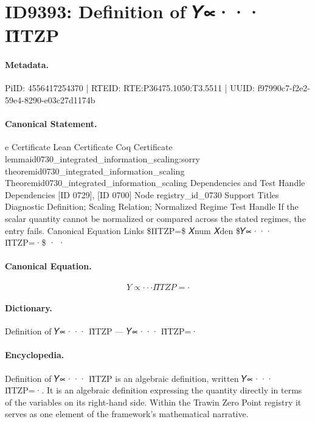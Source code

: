 \section*{ID9393: Definition of 𝑌∝··· Π̂TZP}
\paragraph{Metadata.}
PiID: 4556417254370 | RTEID: RTE:P36475.1050:T3.5511 | UUID: f97990c7-f2e2-59e4-8290-e03c27d1174b

\paragraph{Canonical Statement.}
e Certificate Lean Certificate Coq Certificate lemmaid0730\_integrated\_information\_scaling:sorry theoremid0730\_integrated\_information\_scaling Theoremid0730\_integrated\_information\_scaling Dependencies and Test Handle Dependencies [ID 0729], [ID 0700] Node registry\_id\_0730 Support Titles Diagnostic Definition; Scaling Relation; Normalized Regime Test Handle If the scalar quantity cannot be normalized or compared across the stated regimes, the entry fails. Canonical Equation Links \$ΠTZP=\$ 𝑋num 𝑋den \$𝑌∝··· Π̂TZP=·\$ · ·

\paragraph{Canonical Equation.}
\[
𝑌∝··· Π̂TZP=·
\]

\paragraph{Dictionary.}
Definition of 𝑌∝··· Π̂TZP — 𝑌∝··· Π̂TZP=·

\paragraph{Encyclopedia.}
Definition of 𝑌∝··· Π̂TZP is an algebraic definition, written 𝑌∝··· Π̂TZP=·. It is an algebraic definition expressing the quantity directly in terms of the variables on its right-hand side. Within the Trawin Zero Point registry it serves as one element of the framework's mathematical narrative.
